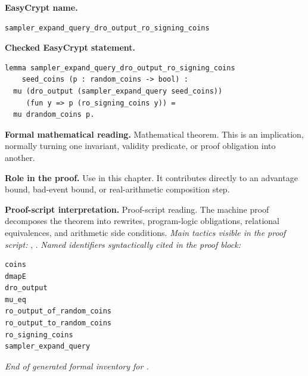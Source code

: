 \begin{formaltheorem}
\noindent\textbf{EasyCrypt name.}
\begin{lstlisting}[language=EasyCrypt,basicstyle=\ttfamily\scriptsize]
sampler_expand_query_dro_output_ro_signing_coins
\end{lstlisting}
\noindent\textbf{Checked EasyCrypt statement.}
\begin{lstlisting}[language=EasyCrypt,basicstyle=\ttfamily\scriptsize]
lemma sampler_expand_query_dro_output_ro_signing_coins
    seed_coins (p : random_coins -> bool) :
  mu (dro_output (sampler_expand_query seed_coins))
     (fun y => p (ro_signing_coins y)) =
  mu drandom_coins p.
\end{lstlisting}
\noindent\textbf{Formal mathematical reading.}
Mathematical theorem. This is an implication, normally turning one invariant, validity predicate, or proof obligation into another.

\noindent\textbf{Role in the proof.}
Use in this chapter. It contributes directly to an advantage bound, bad-event bound, or real-arithmetic composition step.

\noindent\textbf{Proof-script interpretation.}
Proof-script reading. The machine proof decomposes the theorem into rewrites, program-logic obligations, relational equivalences, and arithmetic side conditions.
\emph{Main tactics visible in the proof script:} , .
\emph{Named identifiers syntactically cited in the proof block:}
\begin{lstlisting}[language=EasyCrypt,basicstyle=\ttfamily\scriptsize]
coins
dmapE
dro_output
mu_eq
ro_output_of_random_coins
ro_output_to_random_coins
ro_signing_coins
sampler_expand_query
\end{lstlisting}

\end{formaltheorem}

\medskip
\noindent\emph{End of generated formal inventory for .}
